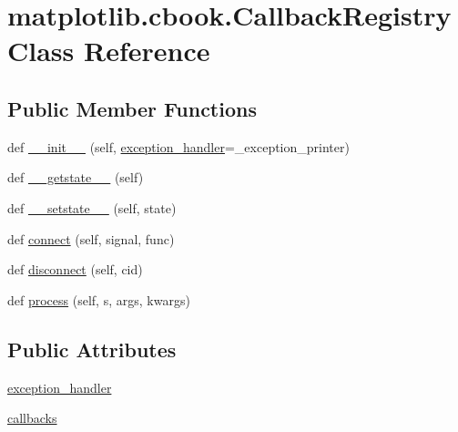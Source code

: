 \hypertarget{classmatplotlib_1_1cbook_1_1CallbackRegistry}{}\section{matplotlib.\+cbook.\+Callback\+Registry Class Reference}
\label{classmatplotlib_1_1cbook_1_1CallbackRegistry}
\subsection*{Public Member Functions}
\begin{DoxyCompactItemize}
\item 
def \hyperlink{classmatplotlib_1_1cbook_1_1CallbackRegistry_a9f3b264a1b4c5d2f700636a58d947178}{\+\_\+\+\_\+init\+\_\+\+\_\+} (self, \hyperlink{classmatplotlib_1_1cbook_1_1CallbackRegistry_a2c68ab86f7ec16b687844de1ad5ce879}{exception\+\_\+handler}=\+\_\+exception\+\_\+printer)
\item 
def \hyperlink{classmatplotlib_1_1cbook_1_1CallbackRegistry_a5bf985dc3fc71122fc3fbdaa24df21d1}{\+\_\+\+\_\+getstate\+\_\+\+\_\+} (self)
\item 
def \hyperlink{classmatplotlib_1_1cbook_1_1CallbackRegistry_a50ad3b506119392cf96d74538fa20cd3}{\+\_\+\+\_\+setstate\+\_\+\+\_\+} (self, state)
\item 
def \hyperlink{classmatplotlib_1_1cbook_1_1CallbackRegistry_ac3f96e0c304d3926e7f8693571f4144a}{connect} (self, signal, func)
\item 
def \hyperlink{classmatplotlib_1_1cbook_1_1CallbackRegistry_a1f7119ba320ac9bfc61f6680f2c08411}{disconnect} (self, cid)
\item 
def \hyperlink{classmatplotlib_1_1cbook_1_1CallbackRegistry_a8c0c087b6c657c760860d14cf3e8b75f}{process} (self, s, args, kwargs)
\end{DoxyCompactItemize}
\subsection*{Public Attributes}
\begin{DoxyCompactItemize}
\item 
\hyperlink{classmatplotlib_1_1cbook_1_1CallbackRegistry_a2c68ab86f7ec16b687844de1ad5ce879}{exception\+\_\+handler}
\item 
\hyperlink{classmatplotlib_1_1cbook_1_1CallbackRegistry_a9ea234f5259f5647b3a9b0a9c04770e3}{callbacks}
\end{DoxyCompactItemize}


